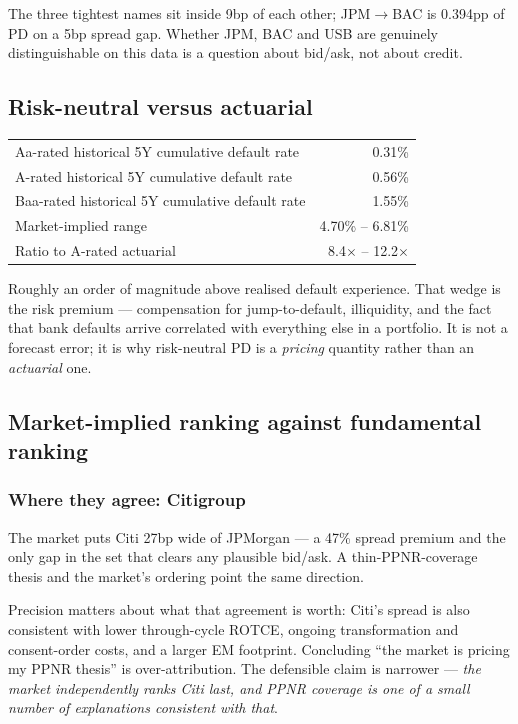 \documentclass[11pt,a4paper]{article}
\begin{document}
The three tightest names sit inside 9bp of each other; JPM$\to$BAC is 0.394pp of PD on a 5bp
spread gap. Whether JPM, BAC and USB are genuinely distinguishable on this data is a question
about bid/ask, not about credit.

\subsection{Risk-neutral versus actuarial}

\begin{center}
\begin{tabular}{lr}
\toprule
Aa-rated historical 5Y cumulative default rate & 0.31\% \\
A-rated historical 5Y cumulative default rate & 0.56\% \\
Baa-rated historical 5Y cumulative default rate & 1.55\% \\
\midrule
Market-implied range & 4.70\% -- 6.81\% \\
Ratio to A-rated actuarial & 8.4$\times$ -- 12.2$\times$ \\
\bottomrule
\end{tabular}
\end{center}

Roughly an order of magnitude above realised default experience. That wedge is the risk
premium --- compensation for jump-to-default, illiquidity, and the fact that bank defaults
arrive correlated with everything else in a portfolio. It is not a forecast error; it is why
risk-neutral PD is a \emph{pricing} quantity rather than an \emph{actuarial} one.

\subsection{Market-implied ranking against fundamental ranking}

\subsubsection*{Where they agree: Citigroup}

The market puts Citi 27bp wide of JPMorgan --- a 47\% spread premium and the only gap in the
set that clears any plausible bid/ask. A thin-PPNR-coverage thesis and the market's ordering
point the same direction.

Precision matters about what that agreement is worth: Citi's spread is also consistent with
lower through-cycle ROTCE, ongoing transformation and consent-order costs, and a larger EM
footprint. Concluding ``the market is pricing my PPNR thesis'' is over-attribution. The
defensible claim is narrower --- \emph{the market independently ranks Citi last, and PPNR
coverage is one of a small number of explanations consistent with that}.
\end{document}
